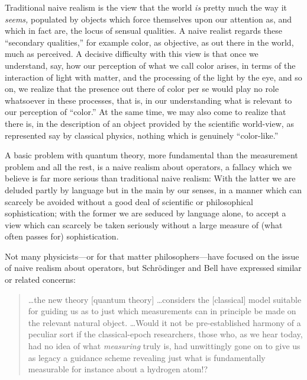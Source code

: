 \documentclass[12pt]{article}
\begin{document}
Traditional naive realism is the view that the world {\it is\/} pretty
much the way it {\it seems,\/} populated by objects which force
themselves upon our attention as, and which in fact are, the locus of
sensual qualities.  A naive realist regards these ``secondary
qualities,'' for example color, as objective, as out there in the
world, much as perceived.  A decisive difficulty with this view is
that once we understand, say, how our perception of what we call color
arises, in terms of the interaction of light with matter, and the
processing of the light by the eye, and so on, we realize that the
presence out there of color per se would play no role whatsoever in
these processes, that is, in our understanding what is relevant to our
perception of ``color.'' At the same time, we may also come to realize
that there is, in the description of an object provided by the
scientific world-view, as represented say by classical physics,
nothing which is genuinely ``color-like.''

A basic problem with quantum theory, more fundamental than the
measurement problem and all the rest, is a naive realism about
operators, a fallacy which we believe is far more serious than
traditional naive realism: With the latter we are deluded partly by
language but in the main by our senses, in a manner which can scarcely
be avoided without a good deal of scientific or philosophical
sophistication; with the former we are seduced by language alone, to
accept a view which can scarcely be taken seriously without a large
measure of (what often passes for) sophistication.

Not many physicists---or for that matter philosophers---have focused
on the issue of naive realism about operators, but Schr\"odinger and
Bell have expressed similar or related concerns:



\begin{quotation}\setlength{\baselineskip}{12pt}\noindent \dots the
   new theory [quantum theory] \dots considers the [classical] model
   suitable for guiding us as to just which measurements can in
   principle be made on the relevant natural object.  \dots Would it
   not be pre-established harmony of a peculiar sort if the
   classical-epoch researchers, those who, as we hear today, had no
   idea of what {\it measuring\/} truly is, had unwittingly gone on to
   give us as legacy a guidance scheme revealing just what is
   fundamentally measurable for instance about a hydrogen
   atom!?~\cite{Sch35}
\end{quotation}
\end{document}
